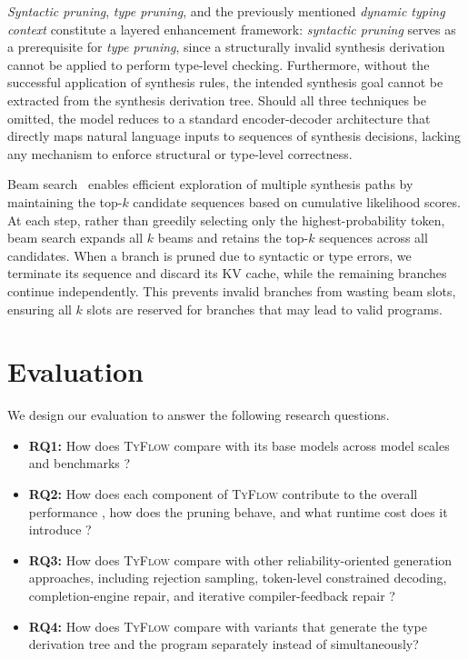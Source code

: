 \documentclass[manuscript,screen]{acmart}
\newcommand{\toolname}[1]{\textsc{#1}}
\newcommand{\mainname}{\toolname{TyFlow}\xspace}
\begin{document}
\emph{Syntactic pruning}, \emph{type pruning}, and the previously mentioned \emph{dynamic typing context} constitute a layered enhancement framework: 
\emph{syntactic pruning} serves as a prerequisite for \emph{type pruning}, since a structurally invalid synthesis derivation cannot be applied to perform type-level checking. 
Furthermore, without the successful application of synthesis rules, the intended synthesis goal cannot be extracted from the synthesis derivation tree. 
Should all three techniques be omitted, the model reduces to a standard encoder-decoder architecture that directly maps natural language inputs to sequences of synthesis decisions, lacking any mechanism to enforce structural or type-level correctness.

Beam search~\cite{DBLP:conf/aclnmt/FreitagA17} enables efficient exploration of multiple synthesis paths by maintaining the top-$k$ candidate sequences based on cumulative likelihood scores. At each step, rather than greedily selecting only the highest-probability token, beam search expands all $k$ beams and retains the top-$k$ sequences across all candidates.
When a branch is pruned due to syntactic or type errors, we terminate its sequence and discard its KV cache, while  {\color{revblue}the } remaining branches continue independently. This prevents invalid branches from wasting beam slots, ensuring all $k$ slots are reserved for branches that may lead to valid programs.
\section{Evaluation \label{sec:evaluation}}
We design our evaluation to answer the following research questions.
\begin{itemize}
    \item \textbf{RQ1:} How does \mainname compare with    {\color{revblue}its base models across model scales and benchmarks} ?
    \item \textbf{RQ2:} How does each component of \mainname contribute   to the overall performance {\color{revblue}, how does the pruning behave, and what runtime cost does it introduce} ?
    \item \textbf{RQ3:} How does   \mainname compare with  {\color{revblue}other reliability-oriented generation approaches, including } rejection sampling,    {\color{revblue}token-level constrained decoding, completion-engine repair, and iterative compiler-feedback repair} ?
    \item \textbf{RQ4:} How does \mainname compare with variants that generate the type derivation tree and the program separately instead of simultaneously?
\end{itemize}
\end{document}
